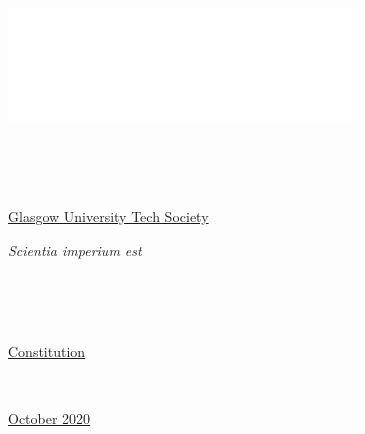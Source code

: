\documentclass[a4paper]{article}
\begin{document}
\begin{center} \includegraphics[height=3cm,decodearray={1 0 0 0 0 0}]{media/gutslogo.png} \end{center}
\hspace*{0.333em}

~

~

\begin{center} \Huge{\underline{Glasgow University Tech Society}} \end{center}

\begin{center} \huge{\textit{Scientia imperium est}} \end{center}

~

~

\begin{center} \huge{\underline{Constitution}} \end{center}

~

\begin{center} \huge{\underline{October 2020}} \end{center}

\newpage



\newpage



\newpage



~
\end{document}
